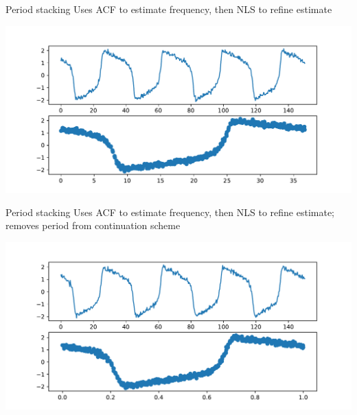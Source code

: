 \documentclass[presentation]{beamer}
\begin{document}
\begin{frame}[label={sec:org82fcd7c}]{Period stacking}
Uses ACF to estimate frequency, then NLS to refine estimate

\begin{center}
\includegraphics[width=.9\linewidth]{./period_stack.pdf}
\end{center}
\end{frame}

\begin{frame}[label={sec:org7c67400}]{Period stacking}
Uses ACF to estimate frequency, then NLS to refine estimate; removes period from continuation scheme

\begin{center}
\includegraphics[width=.9\linewidth]{./period_stack2.pdf}
\end{center}
\end{frame}
\end{document}
